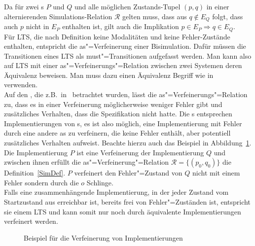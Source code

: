 Da für zwei \MEIO{}s $P$ und $Q$ und alle möglichen Zustands-Tupel $(p,q)$ in
einer alternierenden Simulations-Relation $\mathcal{R}$ gelten muss, dass aus
$q\notin E_Q$ folgt, dass auch $p$ nicht in $E_P$ enthalten ist, gilt auch die
Implikation $p\in E_P\Rightarrow q\in E_Q$.\\
Für LTS, die nach Definition keine Modalitäten
und keine Fehler-Zustände enthalten, entspricht die as"=Verfeinerung einer
Bisimulation. Dafür müssen die Transitionen eines LTS als must"=Transitionen
aufgefasst werden. Man kann also auf LTS mit einer as"=Verfeinerungs"=Relation
zwischen zwei Systemen deren Äquivalenz beweisen. Man muss dazu einen
Äquivalenz Begriff wie in~\cite{Milner1989} verwenden.\\
Auf den \EIO{}, die z.B.\ in~\cite{Schinko2016BA} betrachtet wurden, lässt die
as"=Verfeinerungs"=Relation zu, dass es in einer Verfeinerung möglicherweise
weniger Fehler gibt und zusätzliches Verhalten, dass die Spezifikation nicht
hatte. Die \EIO{}s entsprechen Implementierungen von \MEIO{}s, es ist also
möglich, eine Implementierung mit Fehler durch eine andere as zu verfeinern,
die keine Fehler enthält, aber potentiell zusätzliches Verhalten aufweist.
Beachte hierzu auch das Beispiel in Abbildung~\ref{ImplVerfBsp}. Die
Implementierung $P$ ist eine Verfeinerung der Implementierung $Q$ und
zwischen ihnen erfüllt die as"=Verfeinerung"=Relation $\mathcal{R} =
\{(p_0,q_0)\}$ die Definition~\ref{SimDef}. $P$ verfeinert den Fehler"=Zustand
von $Q$ nicht mit einem Fehler sondern durch die $o$ Schlinge.\\
Falls eine zusammenhängende Implementierung, in der jeder Zustand vom
Startzustand aus erreichbar ist, bereits frei von Fehler"=Zuständen ist,
entspricht sie einem LTS und kann somit nur noch durch äquivalente
Implementierungen \glqq verfeinert\grqq{} werden.

\begin{figure}[htbp]
  \begin{center}
    \caption{Beispiel für die Verfeinerung von Implementierungen}
    \label{ImplVerfBsp}
  \end{center}
\end{figure}


